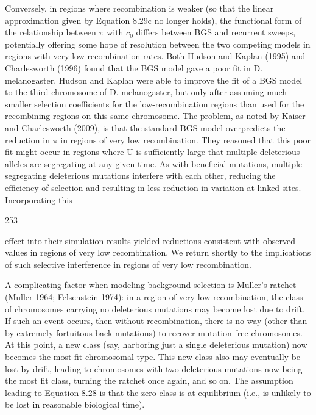 \documentclass{article}
\begin{document}
Conversely, in regions where recombination is weaker (so that the linear approximation given by Equation 8.29c no longer holds), the functional form of the relationship between  $ \pi $ with  $ c_0 $ differs between BGS and recurrent sweeps, potentially offering some hope of resolution between the two competing models in regions with very low recombination rates. Both Hudson and Kaplan (1995) and Charlesworth (1996) found that the BGS model gave a poor fit in D. melanogaster. Hudson and Kaplan were able to improve the fit of a BGS model to the third chromosome of D. melanogaster, but only after assuming much smaller selection coefficients for the low-recombination regions than used for the recombining regions on this same chromosome. The problem, as noted by Kaiser and Charlesworth (2009), is that the standard BGS model overpredicts the reduction in  $ \pi $ in regions of very low recombination. They reasoned that this poor fit might occur in regions where U is sufficiently large that multiple deleterious alleles are segregating at any given time. As with beneficial mutations, multiple segregating deleterious mutations interfere with each other, reducing the efficiency of selection and resulting in less reduction in variation at linked sites. Incorporating this

253

effect into their simulation results yielded reductions consistent with observed values in regions of very low recombination. We return shortly to the implications of such selective interference in regions of very low recombination.

A complicating factor when modeling background selection is Muller's ratchet (Muller 1964; Felsenstein 1974): in a region of very low recombination, the class of chromosomes carrying no deleterious mutations may become lost due to drift. If such an event occurs, then without recombination, there is no way (other than by extremely fortuitous back mutations) to recover mutation-free chromosomes. At this point, a new class (say, harboring just a single deleterious mutation) now becomes the most fit chromosomal type. This new class also may eventually be lost by drift, leading to chromosomes with two deleterious mutations now being the most fit class, turning the ratchet once again, and so on. The assumption leading to Equation 8.28 is that the zero class is at equilibrium (i.e., is unlikely to be lost in reasonable biological time).
\end{document}
